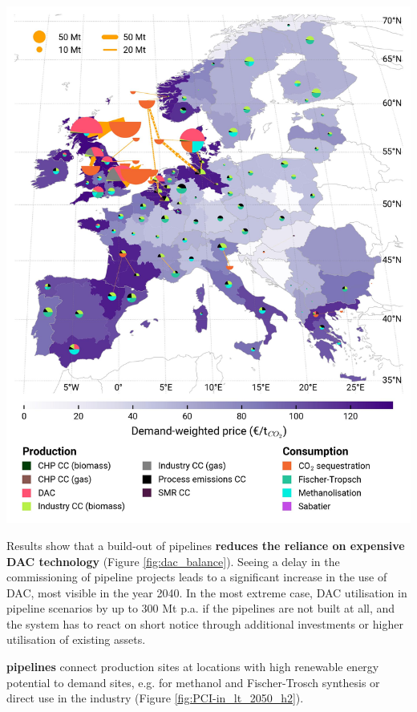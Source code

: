 \documentclass[a0,portrait]{a0poster}
\begin{document}
\begin{multicols}{3}
\begin{center}
    \includegraphics[width=\linewidth]{base_s_adm___2050-balance_map_co2_stored.jpg}
    \label{fig:PCI-in_lt_2050_co2}
\end{center}
\vspace{2em}
\noindent Results show that a build-out of  pipelines \textbf{reduces the reliance on expensive DAC technology} (Figure \ref{fig:dac_balance}). Seeing a delay in the commissioning of pipeline projects leads to a significant increase in the use of DAC, most visible in the year 2040. In the most extreme case, DAC utilisation in pipeline scenarios by up to 300 Mt p.a. if the pipelines are not built at all, and the system has to react on short notice through additional investments or higher utilisation of existing assets.

\noindent \textbf{ pipelines} connect production sites at locations with high renewable energy potential to demand sites, e.g. for methanol and Fischer-Trosch synthesis or direct use in the industry (Figure \ref{fig:PCI-in_lt_2050_h2}).


\end{multicols}
\end{document}
